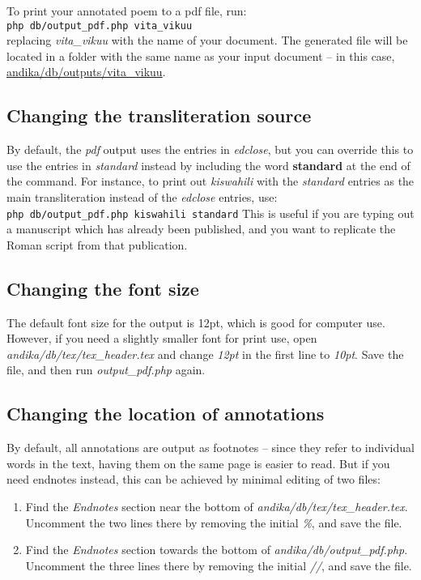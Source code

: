 To print your annotated poem to a pdf file, run:\\
\verb|php db/output_pdf.php vita_vikuu|\\
replacing \textit{vita_vikuu} with the name of your document.  The generated file will be located in a folder with the same name as your input document -- in this case, \url{andika/db/outputs/vita_vikuu}.

\subsection{Changing the transliteration source}

By default, the \textit{pdf} output uses the entries in \textit{edclose}, but you can override this to use the entries in \textit{standard} instead by including the word \textbf{standard} at the end of the command.  For instance, to print out \textit{kiswahili} with the \textit{standard} entries as the main transliteration instead of the \textit{edclose} entries, use:\\
\verb|php db/output_pdf.php kiswahili standard|
This is useful if you are typing out a manuscript which has already been published, and you want to replicate the Roman script from that publication.

\subsection{Changing the font size}
\label{s:outfont}

The default font size for the output is 12pt, which is good for computer use.  However, if you need a slightly smaller font for print use, open \textit{andika/db/tex/tex_header.tex} and change \textit{12pt} in the first line to \textit{10pt}.  Save the file, and then run \textit{output_pdf.php} again.

\subsection{Changing the location of annotations}
\label{s:outloc}

By default, all annotations are output as footnotes -- since they refer to individual words in the text, having them on the same page is easier to read.  But if you need endnotes instead, this can be achieved by minimal editing of two files:
\begin{enumerate}
\item Find the \textit{Endnotes} section near the bottom of \textit{andika/db/tex/tex_header.tex}.  Uncomment the two lines there by removing the initial \textit{\%}, and save the file.
\item Find the \textit{Endnotes} section towards the bottom of \textit{andika/db/output_pdf.php}.  Uncomment the three lines there by removing the initial \textit{//}, and save the file.
\end{enumerate}

